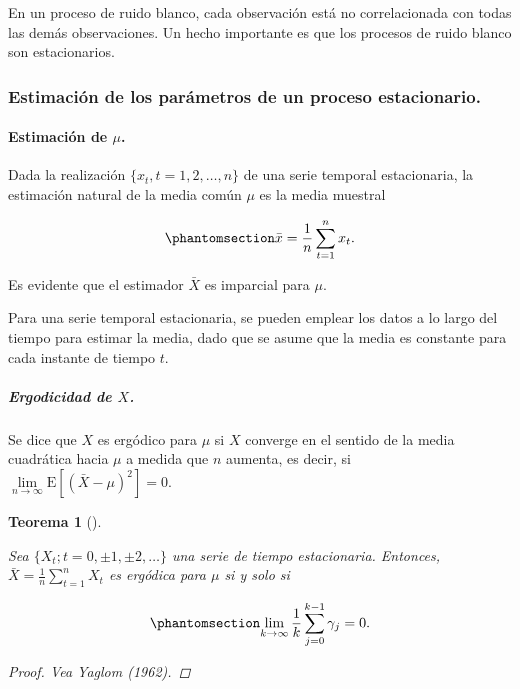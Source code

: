 \documentclass[
  us-letterpaper,
]{scrreprt}
\let\oldparagraph\paragraph
\renewcommand{\paragraph}[1]{\oldparagraph{#1}\mbox{}}
\let\oldsubparagraph\subparagraph
\renewcommand{\subparagraph}[1]{\oldsubparagraph{#1}\mbox{}}
\theoremstyle{plain}
\theoremstyle{definition}
\theoremstyle{definition}
\theoremstyle{plain}
\newtheorem{theorem}{Teorema}[chapter]
\theoremstyle{remark}
\begin{document}
En un proceso de ruido blanco, cada observación está no correlacionada
con todas las demás observaciones. Un hecho importante es que los
procesos de ruido blanco son estacionarios.

\subsubsection{Estimación de los parámetros de un proceso
estacionario.}\label{estimaciuxf3n-de-los-paruxe1metros-de-un-proceso-estacionario.}

\paragraph{\texorpdfstring{Estimación de
\(\mu\).}{Estimación de \textbackslash mu.}}\label{estimaciuxf3n-de-mu.}

Dada la realización \(\{x_t, t = 1, 2,\ldots , n\}\) de una serie
temporal estacionaria, la estimación natural de la media común \(\mu\)
es la media muestral

\begin{equation}\phantomsection\label{eq-media}{
\bar{x}=\frac{1}{n}\sum_{t=1}^n x_t.
}\end{equation}

Es evidente que el estimador \(\bar{X}\) es imparcial para \(\mu\).

Para una serie temporal estacionaria, se pueden emplear los datos a lo
largo del tiempo para estimar la media, dado que se asume que la media
es constante para cada instante de tiempo \(t\).

\subparagraph{\texorpdfstring{Ergodicidad de
\(X\).}{Ergodicidad de X.}}\label{ergodicidad-de-x.}

Se dice que \(X\) es ergódico para \(\mu\) si \(X\) converge en el
sentido de la media cuadrática hacia \(\mu\) a medida que \(n\) aumenta,
es decir, si \(\lim\limits_{n\to\infty}\mathrm{E}[(\bar X -\mu)^2]=0\).

\begin{theorem}[]\protect\hypertarget{thm-ergo}{}\label{thm-ergo}

Sea \(\{X_t; t=0,\pm 1,\pm 2, \ldots\}\) una serie de tiempo
estacionaria. Entonces, \(\bar X = \frac{1}{n}\sum\limits_{t=1}^n X_t\)
es ergódica para \(\mu\) si y solo si

\begin{equation}\phantomsection\label{eq-ergo}{
\lim\limits_{k\to \infty} \frac{1}{k} \sum_{j=0}^{k-1} \gamma_j =0.
}\end{equation}

\begin{proof}
Vea Yaglom (1962).
\end{proof}

\end{theorem}
\end{document}
